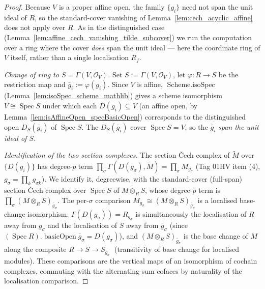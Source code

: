 \begin{proof}
  Because \(V\) is a proper affine open, the family \(\{g_i\}\) need not span the unit ideal of \(R\), so
  the standard-cover vanishing of Lemma~\ref{lem:cech_acyclic_affine} does not apply over \(R\). As in the
  distinguished case (Lemma~\ref{lem:affine_cech_vanishing_tilde_subcover}) we run the computation over a
  ring where the cover \emph{does} span the unit ideal --- here the coordinate ring of \(V\) itself, rather
  than a single localisation \(R_f\).

  \emph{Change of ring to \(S = \Gamma(V, \mathcal{O}_V)\).} Set \(S := \Gamma(V, \mathcal{O}_V)\), let
  \(\varphi : R \to S\) be the restriction map and \(\bar g_i := \varphi(g_i)\). Since \(V\) is affine,
  \(\operatorname{Scheme.isoSpec}\) (Lemma~\ref{lem:isoSpec_scheme_mathlib}) gives a scheme isomorphism
  \(V \cong \operatorname{Spec} S\) under which each \(D(g_i) \subseteq V\) (an affine open, by
  Lemma~\ref{lem:isAffineOpen_specBasicOpen}) corresponds to the distinguished open \(D_S(\bar g_i)\) of
  \(\operatorname{Spec} S\). The \(D_S(\bar g_i)\) cover \(\operatorname{Spec} S = V\), so the \(\bar g_i\)
  \emph{span the unit ideal of \(S\)}.

  \emph{Identification of the two section complexes.} The section {\v C}ech complex of \(\widetilde{M}\)
  over \(\{D(g_i)\}\) has degree-\(p\) term \(\prod_\sigma \Gamma(D(g_\sigma), \widetilde{M}) = \prod_\sigma
  M_{g_\sigma}\) (Tag 01HV item (4), \(g_\sigma = \prod_k g_{\sigma k}\)). We identify it, degreewise, with
  the standard-cover (full-span) section {\v C}ech complex over \(\operatorname{Spec} S\) of
  \(\widetilde{M \otimes_R S}\), whose degree-\(p\) term is \(\prod_\sigma (M \otimes_R S)_{\bar g_\sigma}\).
  The per-\(\sigma\) comparison \(M_{g_\sigma} \cong (M \otimes_R S)_{\bar g_\sigma}\) is a localised
  base-change isomorphism: \(\Gamma(D(g_\sigma)) = R_{g_\sigma}\) is simultaneously the localisation of \(R\)
  away from \(g_\sigma\) and the localisation of \(S\) away from \(\bar g_\sigma\) (since
  \((\operatorname{Spec} R).\operatorname{basicOpen}\bar g_\sigma = D(g_\sigma)\)), and \((M \otimes_R
  S)_{\bar g_\sigma}\) is the base change of \(M\) along the composite \(R \to S \to S_{\bar g_\sigma}\;\)
  (transitivity of base change for localised modules). These comparisons are the vertical maps of an
  isomorphism of cochain complexes, commuting with the alternating-sum cofaces by naturality of the
  localisation comparison.


\end{proof}

